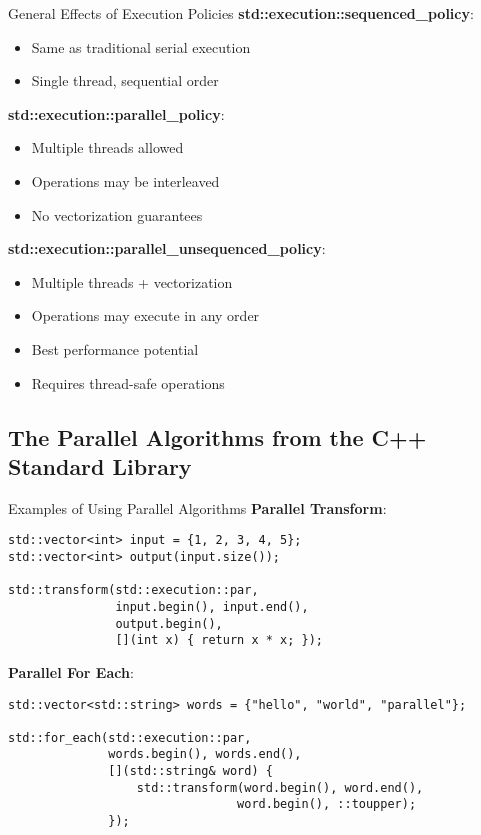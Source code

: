 \begin{frame}{General Effects of Execution Policies}
	\textbf{std::execution::sequenced\_policy}:
	\begin{itemize}
		\item Same as traditional serial execution
		\item Single thread, sequential order
	\end{itemize}

	\vspace{0.5em}
	\textbf{std::execution::parallel\_policy}:
	\begin{itemize}
		\item Multiple threads allowed
		\item Operations may be interleaved
		\item No vectorization guarantees
	\end{itemize}

	\vspace{0.5em}
	\textbf{std::execution::parallel\_unsequenced\_policy}:
	\begin{itemize}
		\item Multiple threads + vectorization
		\item Operations may execute in any order
		\item Best performance potential
		\item Requires thread-safe operations
	\end{itemize}
\end{frame}

\subsection{The Parallel Algorithms from the C++ Standard Library}
\begin{frame}[fragile]{Examples of Using Parallel Algorithms}
	\textbf{Parallel Transform}:
	\begin{verbatim}
std::vector<int> input = {1, 2, 3, 4, 5};
std::vector<int> output(input.size());

std::transform(std::execution::par,
               input.begin(), input.end(),
               output.begin(),
               [](int x) { return x * x; });
	\end{verbatim}

	\textbf{Parallel For Each}:
	\begin{verbatim}
std::vector<std::string> words = {"hello", "world", "parallel"};

std::for_each(std::execution::par,
              words.begin(), words.end(),
              [](std::string& word) {
                  std::transform(word.begin(), word.end(),
                                word.begin(), ::toupper);
              });
	\end{verbatim}
\end{frame}

